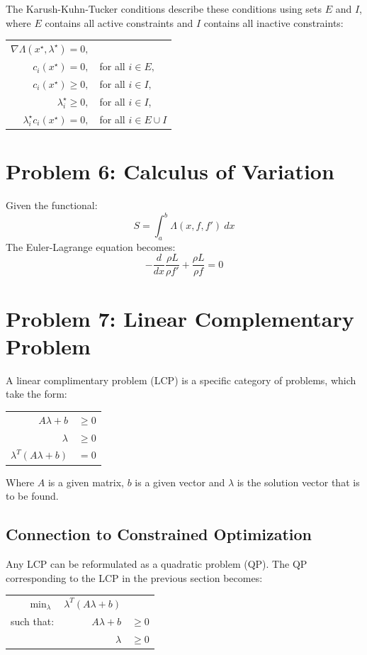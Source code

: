 \documentclass[10pt,oneside,a4paper,final,english]{memoir}
\begin{document}
The Karush-Kuhn-Tucker conditions describe these conditions using sets
$E$ and $I$, where $E$ contains all active constraints and $I$
contains all inactive constraints:
\begin{center}\begin{tabular}{rl}
$ \nabla \Lambda(x^\star, \lambda^\star) = 0,$ & \\
$  c_i(x^\star) = 0, $ & for all $i \in E,$ \\
$  c_i(x^\star) \geq 0,$ & for all $i \in I,$ \\
$ \lambda_i^\star \geq 0,$ & for all $i \in I$, \\
$ \lambda_i^\star c_i(x^\star) = 0,$ & for all $i \in E \cup I$
\end{tabular}\end{center}


\section{Problem 6: Calculus of Variation}
Given the functional:
\[ S = \int_a^b \Lambda (x, f, f')\ dx\]
The Euler-Lagrange equation becomes:
\[ - \frac{d}{dx}\frac{\rho L}{\rho f'} + \frac{\rho L}{\rho f} = 0 \]


\section{Problem 7: Linear Complementary Problem}
A linear complimentary problem (LCP) is a specific category of
problems, which take the form:\\

\begin{center}\begin{tabular}{rl}
$A\lambda + b$ & $\geq 0$ \\
$\lambda$ & $\geq 0$\\
$\lambda^T (A\lambda + b)$ & $= 0$
\end{tabular}\end{center}

Where $A$ is a given matrix, $b$ is a given vector and $\lambda$ is
the solution vector that is to be found.


\subsection{Connection to Constrained Optimization}
Any LCP can be reformulated as a quadratic problem (QP). The QP
corresponding to the LCP in the previous section becomes:
\begin{center}\begin{tabular}{rrl}
$\min_\lambda$ & $\lambda^T(A\lambda+b)$ & \\
such that: & $A\lambda + b$ & $\geq 0$ \\
           & $\lambda $ & $\geq 0$
\end{tabular}\end{center}
\end{document}
